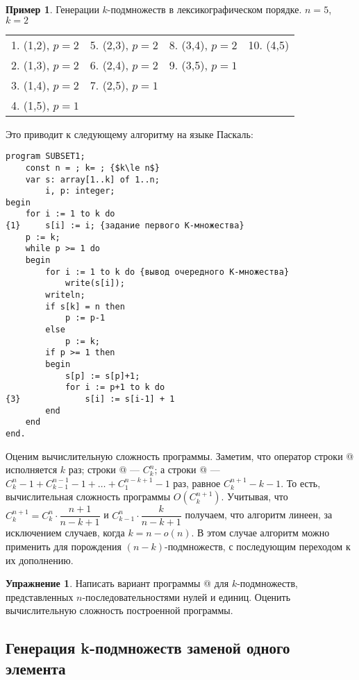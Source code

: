 \documentclass[12pt,a4paper]{article}
\theoremstyle{plain}
\theoremstyle{definition}
\newtheorem*{task}{Упражнение}
\newtheorem*{example}{Пример}
\theoremstyle{remark}
\begin{document}
\begin{example}
Генерации $k$-подмножеств в лексикографическом порядке. $n=5$, $k=2$

\begin{tabular}{cccc}
1. (1,2), $p=2$ & 5. (2,3), $p=2$ & 8. (3,4), $p=2$ & 10. (4,5) \\
2. (1,3), $p=2$ & 6. (2,4), $p=2$ & 9. (3,5), $p=1$ \\
3. (1,4), $p=2$ & 7. (2,5), $p=1$ \\
4. (1,5), $p=1$
\end{tabular}
\end{example}

Это приводит к следующему алгоритму на языке Паскаль:

\begin{verbatim}
program SUBSET1;
    const n = ; k= ; {$k\le n$}
    var s: array[1..k] of 1..n;
        i, p: integer;
begin
    for i := 1 to k do
{1}     s[i] := i; {задание первого K-множества}
    p := k;
    while p >= 1 do
    begin
        for i := 1 to k do {вывод очередного K-множества}
            write(s[i]);
        writeln;
        if s[k] = n then
            p := p-1
        else
            p := k;
        if p >= 1 then
        begin
            s[p] := s[p]+1;
            for i := p+1 to k do
{3}             s[i] := s[i-1] + 1
        end
    end
end.
\end{verbatim}

Оценим вычислительную сложность программы. Заметим, что оператор строки @ исполняется $k$ раз; строки @ --- $C_k^n$; а строки @ --- $C_k^n - 1 + C_{k-1}^{n-1}-1 + \ldots + C_1^{n-k+1}-1$ раз, равное $C_k^{n+1} - k - 1$. То есть, вычислительная сложность программы $O(C_k^{n+1})$. Учитывая, что $C_k^{n+1} = C_k^n \cdot \dfrac{n+1}{n-k+1}$ и $C_{k-1}^n \cdot \dfrac{k}{n-k+1}$ получаем, что алгоритм линеен, за исключением случаев, когда $k=n-o(n)$. В этом случае алгоритм можно применить для порождения $(n-k)$-подмножеств, с последующим переходом к их дополнению.

\begin{task}
Написать вариант программы @ для $k$-подмножеств, представленных $n$-последовательностями нулей и единиц. Оценить вычислительную сложность построенной программы.
\end{task}

\subsection{Генерация k-подмножеств заменой одного элемента}
\end{document}
